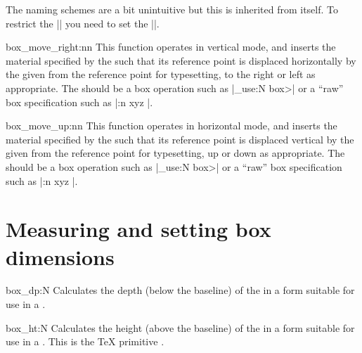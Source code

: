 The naming schemes are a bit unintuitive but this is inherited from \tex itself. To restrict the |\vbox| you need to set the |\hsize|.  

 \begin{docCommand}{box_move_right:nn}{  }
 This function operates in vertical mode, and inserts the
  material specified by the 
  such that its reference point is displaced horizontally by the given
    from the reference point for typesetting, to the right
   or left as appropriate. The  should be
   a box operation such as |\box_use:N \<box>| or a \enquote{raw}
   box specification such as |\vbox:n { xyz }|.
 \end{docCommand}

 \begin{docCommand}{box_move_up:nn}{  }
   This function operates in horizontal mode, and inserts the
   material specified by the 
   such that its reference point is displaced vertical by the given
    from the reference point for typesetting, up
   or down as appropriate. The  should be
   a box operation such as |\box_use:N \<box>| or a \enquote{raw}
   box specification such as |\vbox:n { xyz }|.
 \end{docCommand}
 

 \section{Measuring and setting box dimensions}

\begin{docCommand}{box_dp:N}{ }
   Calculates the depth (below the baseline) of the 
   in a form suitable for use in a .
\end{docCommand}

\begin{docCommand}{box_ht:N}{ }
   Calculates the height (above the baseline) of the 
   in a form suitable for use in a .
  This is the \TeX{} primitive .
 \end{docCommand}

